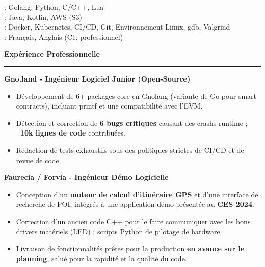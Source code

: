 \documentclass[9pt]{extarticle}
\begin{document}
\hspace*{5pt}{\bfseries Maîtrise}: Golang, Python, C/C++, Lua
\\
\hspace*{5pt}{\bfseries Notions}: Java, Kotlin, AWS (S3)
\\
\hspace*{5pt}{\bfseries Systèmes \& Outils}: Docker, Kubernetes, CI/CD, Git, Environnement Linux, gdb, Valgrind
\\
\hspace*{5pt}{\bfseries Langues}: Français, Anglais (C1, professionnel)

\par\vspace{5pt}

{\large\bfseries Expérience Professionnelle}
\par\vspace{-8pt}
\rule{\linewidth}{0.4pt}
\par\vspace{5pt}

{\bfseries Gno.land - Ingénieur Logiciel Junior (Open-Source)}
\begin{itemize}[noitemsep, topsep=0pt]
	\item Développement de 6+ packages core en Gnolang (variante de Go pour smart contracts), incluant printf et une compatibilité avec l'EVM.
	\item Détection et correction de {\bfseries 6 bugs critiques} causant des crashs runtime ; {\bfseries ~10k lignes de code} contribuées.
	\item Rédaction de tests exhaustifs sous des politiques strictes de CI/CD et de revue de code.
\end{itemize}

\par\vspace{5pt}

{\bfseries Faurecia / Forvia - Ingénieur Démo Logicielle}
\begin{itemize}[noitemsep, topsep=0pt]
	\item Conception d'un {\bfseries moteur de calcul d'itinéraire GPS} et d'une interface de recherche de POI, intégrés à une application démo présentée au {\bfseries CES 2024}.
	\item Correction d'un ancien code C++ pour le faire communiquer avec les bons drivers matériels (LED) ; scripts Python de pilotage de hardware.
	\item Livraison de fonctionnalités prêtes pour la production {\bfseries en avance sur le planning}, salué pour la rapidité et la qualité du code.
\end{itemize}
\end{document}
